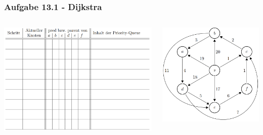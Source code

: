 \documentclass{beamer}
\begin{document}
\begin{frame}
	\frametitle{Aufgabe 13.1 - Dijkstra}
	\begin{columns}
		\begin{column}{0.75\textwidth}
			\includegraphics[width=\textwidth]{images/dijkstra_table.png}
		\end{column}
		\begin{column}{0.33\textwidth}
			\includegraphics[width=\textwidth]{images/dijkstra.png}
		\end{column}
	\end{columns}
\end{frame}
\end{document}
